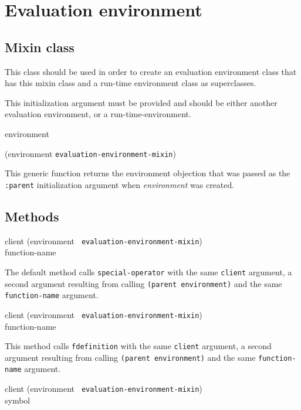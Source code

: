 \chapter{Evaluation environment}

\section{Mixin class}


This class should be used in order to create an evaluation environment
class that has this mixin class and a run-time environment class as
superclasses.


This initialization argument must be provided and should be either
another evaluation environment, or a run-time-environment.

 {environment}

 {(environment {\tt evaluation-environment-mixin})}

This generic function returns the environment objection that was passed
as the \texttt{:parent} initialization argument when
\textit{environment} was created.

\section{Methods}

{\small{} {client (environment {\tt
      evaluation-environment-mixin}) \\ function-name}
}

The default method calls \texttt{special-operator} with the same
\texttt{client} argument, a second argument resulting from calling
\texttt{(parent environment)} and the same \texttt{function-name} argument.

{\small{} {client (environment {\tt
      evaluation-environment-mixin}) \\ function-name}
}

This method calls \texttt{fdefinition} with the same \texttt{client} argument,
a second argument resulting from calling \texttt{(parent environment)} and the
same \texttt{function-name} argument.

{\small{} {client (environment {\tt
      evaluation-environment-mixin}) \\ symbol}
}

